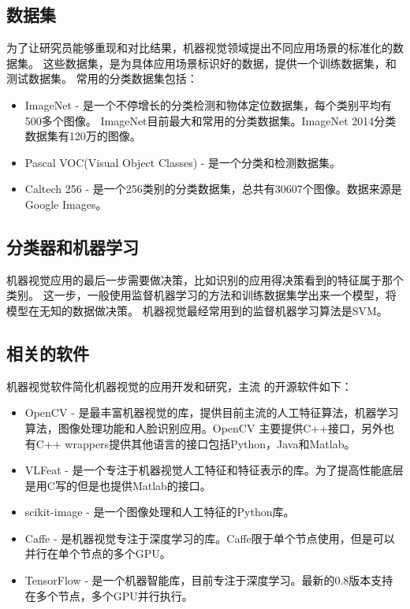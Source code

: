 
\subsection{数据集}
为了让研究员能够重现和对比结果，机器视觉领域提出不同应用场景的标准化的数据集。
这些数据集，是为具体应用场景标识好的数据，提供一个训练数据集，和测试数据集。
常用的分类数据集包括：
\begin{itemize}
  \item ImageNet - 是一个不停增长的分类检测和物体定位数据集，每个类别平均有500多个图像。
        ImageNet目前最大和常用的分类数据集。ImageNet 2014分类数据集有120万的图像。\cite{deng2009imagenet}
  \item Pascal VOC(Visual Object Classes) - 是一个分类和检测数据集。\cite{everingham2010pascal}
  \item Caltech 256 - 是一个256类别的分类数据集，总共有30607个图像。数据来源是Google Images。\cite{griffin2007caltech}
\end{itemize}
        


\subsection{分类器和机器学习}
\label{subsubsec:classifier}
机器视觉应用的最后一步需要做决策，比如识别的应用得决策看到的特征属于那个类别。
这一步，一般使用监督机器学习的方法和训练数据集学出来一个模型，将模型在无知的数据做决策。
机器视觉最经常用到的监督机器学习算法是SVM。

\subsection{相关的软件}
机器视觉软件简化机器视觉的应用开发和研究，主流
的开源软件如下：
\begin{itemize}
  \item OpenCV - 是最丰富机器视觉的库，提供目前主流的人工特征算法，机器学习算法，图像处理功能和人脸识别应用。OpenCV
        主要提供C++接口，另外也有C++ wrappers提供其他语言的接口包括Python，Java和Matlab。
  \item VLFeat - 是一个专注于机器视觉人工特征和特征表示的库。为了提高性能底层是用C写的但是也提供Matlab的接口。
  \item scikit-image - 是一个图像处理和人工特征的Python库。
  \item Caffe - 是机器视觉专注于深度学习的库。Caffe限于单个节点使用，但是可以并行在单个节点的多个GPU。
  \item TensorFlow - 是一个机器智能库，目前专注于深度学习。最新的0.8版本支持在多个节点，多个GPU并行执行。
\end{itemize}



